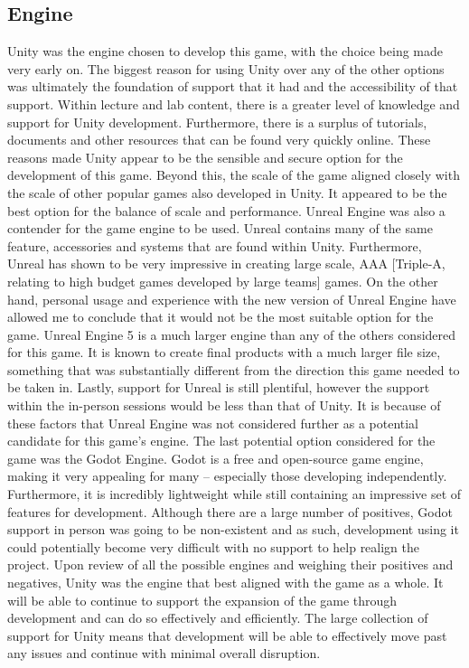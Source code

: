 \documentclass[11pt]{article}
\begin{document}
\subsection{Engine}
Unity was the engine chosen to develop this game, with the choice being made very early on. The biggest reason for using Unity over any of the other options was ultimately the foundation of support that it had and the accessibility of that support. Within lecture and lab content, there is a greater level of knowledge and support for Unity development. Furthermore, there is a surplus of tutorials, documents and other resources that can be found very quickly online. These reasons made Unity appear to be the sensible and secure option for the development of this game. Beyond this, the scale of the game aligned closely with the scale of other popular games also developed in Unity. It appeared to be the best option for the balance of scale and performance. 
Unreal Engine was also a contender for the game engine to be used. Unreal contains many of the same feature, accessories and systems that are found within Unity. Furthermore, Unreal has shown to be very impressive in creating large scale, AAA [Triple-A, relating to high budget games developed by large teams] games. On the other hand, personal usage and experience with the new version of Unreal Engine have allowed me to conclude that it would not be the most suitable option for the game. Unreal Engine 5 is a much larger engine than any of the others considered for this game. It is known to create final products with a much larger file size, something that was substantially different from the direction this game needed to be taken in. Lastly, support for Unreal is still plentiful, however the support within the in-person sessions would be less than that of Unity. It is because of these factors that Unreal Engine was not considered further as a potential candidate for this game’s engine.
The last potential option considered for the game was the Godot Engine. Godot is a free and open-source game engine, making it very appealing for many – especially those developing independently. Furthermore, it is incredibly lightweight while still containing an impressive set of features for development. Although there are a large number of positives, Godot support in person was going to be non-existent and as such, development using it could potentially become very difficult with no support to help realign the project. 
Upon review of all the possible engines and weighing their positives and negatives, Unity was the engine that best aligned with the game as a whole. It will be able to continue to support the expansion of the game through development and can do so effectively and efficiently. The large collection of support for Unity means that development will be able to effectively move past any issues and continue with minimal overall disruption. \\
\end{document}
